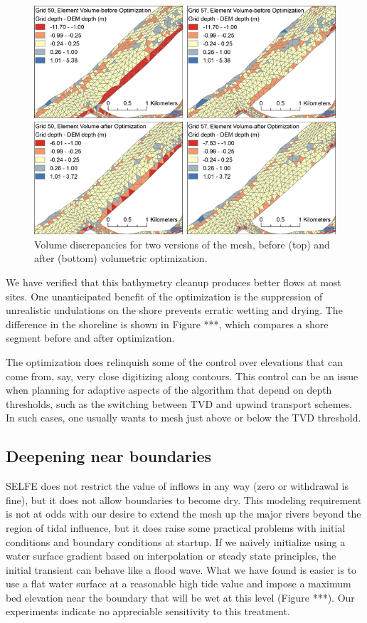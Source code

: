 \begin{figure}
	\centering
		\includegraphics[scale=1.00]{image/optimization}
	\caption{Volume discrepancies for two versions of the mesh, before (top) and after (bottom) volumetric optimization.}
	\label{fig:optimization}
\end{figure}


We have verified that this bathymetry cleanup produces better flows at most sites. 
One unanticipated benefit of the optimization is the suppression of
 unrealistic undulations on the shore prevents erratic wetting and drying. The difference in the shoreline is shown 
in Figure ***, which compares a shore segment before and after optimization. 

The optimization does relinquish 
some of the control over elevations that can come from, say, very close digitizing along contours. 
This control can be an issue when planning for adaptive aspects of the algorithm that 
depend on depth thresholds, such as the switching between TVD and upwind transport schemes. In such cases, 
one usually wants to mesh just above or below the TVD threshold. 




\subsection{Deepening near boundaries}
SELFE does not restrict the value of inflows in any way (zero or withdrawal is fine), but it does not allow boundaries to become
dry. This modeling requirement is not at odds with our desire to extend the mesh up the major rivers beyond the region of tidal influence, but
it does raise some practical problems with initial conditions and boundary conditions at startup. If we na\"{\i}vely
initialize using a water surface gradient based on interpolation or steady state principles, the initial transient can 
behave like a flood wave. What we have found is easier is to use a flat water surface at a reasonable high tide value and impose
a maximum bed elevation near the boundary that will be wet at this level (Figure ***). Our experiments indicate no appreciable
sensitivity to this treatment.


